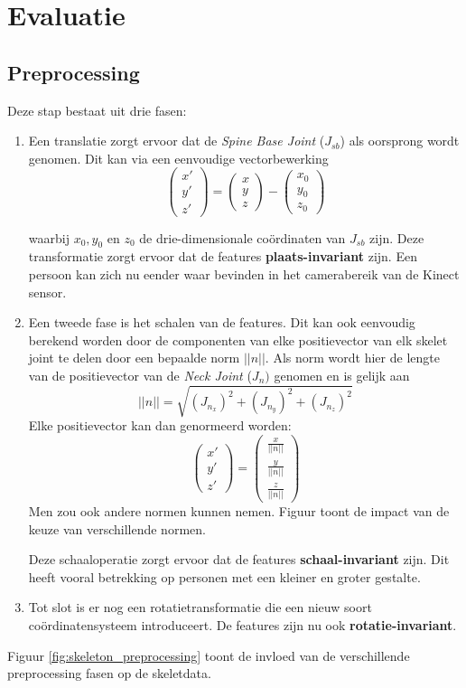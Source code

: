 \chapter{Evaluatie}

\section{Preprocessing}

Deze stap bestaat uit drie fasen:
\begin{enumerate}
	\item Een translatie zorgt ervoor dat de \textit{Spine Base Joint} ($J_{sb}$) als oorsprong wordt genomen. Dit kan via een eenvoudige vectorbewerking 
	$$\begin{pmatrix}
	x' \\ y' \\ z'
	\end{pmatrix}
	= \begin{pmatrix}
	x \\ y \\ z
	\end{pmatrix}
	- \begin{pmatrix}
	x_0 \\ y_0 \\ z_0
	\end{pmatrix}$$
	
	waarbij $x_0, y_0$ en $z_0$ de drie-dimensionale coördinaten van $J_{sb}$ zijn. Deze transformatie zorgt ervoor dat de features \textbf{plaats-invariant} zijn. Een persoon kan zich nu eender waar bevinden in het camerabereik van de Kinect sensor.
	\item Een tweede fase is het schalen van de features. Dit kan ook eenvoudig berekend worden door de componenten van elke positievector van elk skelet joint te delen door een bepaalde norm $||n||$. Als norm wordt hier de lengte van de positievector van de \textit{Neck Joint} ($J_n)$ genomen en is gelijk aan
	$$||n|| = \sqrt{(J_{n_x})^2 + (J_{n_y})^2 + (J_{n_z})^2}$$
	Elke positievector kan dan genormeerd worden:
	$$
	\begin{pmatrix}
	x' \\ y' \\ z'
	\end{pmatrix}
	=				
	\begin{pmatrix}
	\frac{x}{||n||} \\ \frac{y}{||n||}  \\ \frac{z}{||n||} 
	\end{pmatrix}$$
	Men zou ook andere normen kunnen nemen. Figuur  toont de impact van de keuze van verschillende normen.
	
	Deze schaaloperatie zorgt ervoor dat de features \textbf{schaal-invariant} zijn. Dit heeft vooral betrekking op personen met een kleiner en groter gestalte.
	\item Tot slot is er nog een rotatietransformatie die een nieuw soort coördinatensysteem introduceert. De features zijn nu ook \textbf{rotatie-invariant}.
\end{enumerate}
Figuur \ref{fig:skeleton_preprocessing} toont de invloed van de verschillende preprocessing fasen op de skeletdata.

